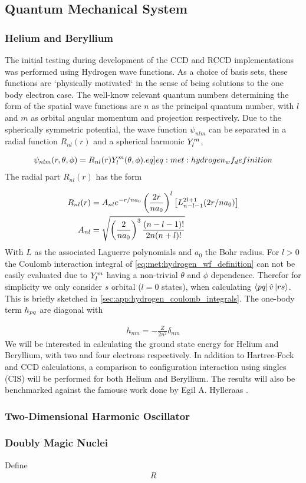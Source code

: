 \subsection{Quantum Mechanical System}

\subsubsection{Helium and Beryllium}
The initial testing during development of the CCD and RCCD implementations was performed using Hydrogen wave functions. As a choice of basis sets, these functions are `physically motivated` in the sense of being solutions to the one body electron case. The well-know relevant quantum numbers determining the form of the spatial wave functions are $n$ as the principal quantum number, with $l$ and $m$ as orbital angular momentum and projection respectively. Due to the spherically symmetric potential, the wave function $\psi_{nlm}$ can be separated in a radial function $R_{nl}(r)$ and a spherical harmonic $Y^{m}_{l}$,  

\begin{align}
    \psi_{nlm}(r,\theta,\phi) = R_{nl}(r) \sphericalharmonic{m}{l}(\theta, \phi). \label[eq]{eq:met:hydrogen_wf_definition}
\end{align}
The radial part $R_{nl}(r)$ has the form

\begin{align*}
    R_{nl}(r) &= A_{nl} e^{-r/na_0} \left(\frac{2r}{na_0}\right)^l \left[L^{2l+1}_{n-l-1}(2r/na_0)\right] \\
    A_{nl} &= \sqrt{ \left(\frac{2}{na_0}\right)^3 \frac{(n-l-1)!}{2n(n+l)!} }
\end{align*}
With $L$ as the associated Laguerre polynomials and $a_0$ the Bohr radius. For $l > 0$ the Coulomb interaction integral of \cref{eq:met:hydrogen_wf_definition} can not be easily evaluated due to $Y^{m}_{l}$ having a non-trivial $\theta$ and $\phi$ dependence. Therefor for simplicity we only consider $s$ orbital ($l=0$ states), when calculating $\bra{pq}\hat{v}\ket{rs}$. This is briefly sketched in \cref{sec:app:hydrogen_coulomb_integrals}. The one-body term $h_{pq}$ are diagonal with 

\begin{align}
    h_{nm} = -\frac{Z}{2n^2}\delta_{nm}
\end{align}
We will be interested in calculating the ground state energy for Helium and Beryllium, with two and four electrons respectively. In addition to Hartree-Fock and CCD calculations, a comparison to configuration interaction using singles (CIS) will be performed for both Helium and Beryllium. The results will also be benchmarked against the famouse work done by Egil A. Hylleraas \citep{hylleraasNumerischeBerechnung2STerme1930}.

\subsubsection{Two-Dimensional Harmonic Oscillator}
\subsubsection{Doubly Magic Nuclei}
Define
\begin{align}
    R
\end{align}
